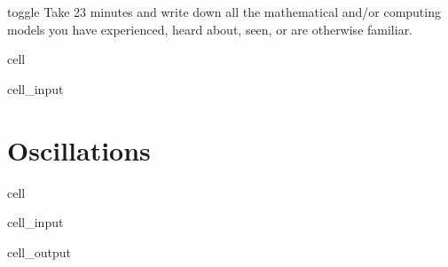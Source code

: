 \documentclass[letterpaper,10pt,english]{jupyterBook}
\begin{document}
\begin{sphinxuseclass}{toggle}
\sphinxAtStartPar
Take 2\sphinxhyphen{}3 minutes and write down all the mathematical and/or computing models you have experienced, heard about, seen, or are otherwise familiar.

\end{sphinxuseclass}
\begin{sphinxuseclass}{cell}\begin{sphinxVerbatimInput}

\begin{sphinxuseclass}{cell_input}
\begin{sphinxVerbatim}[commandchars=\\\{\}]

\end{sphinxVerbatim}

\end{sphinxuseclass}\end{sphinxVerbatimInput}

\end{sphinxuseclass}
\sphinxstepscope


\chapter{Oscillations}
\label{\detokenize{content/2_oscillations/readings-oscillators:oscillations}}\label{\detokenize{content/2_oscillations/readings-oscillators::doc}}
\begin{sphinxuseclass}{cell}\begin{sphinxVerbatimInput}

\begin{sphinxuseclass}{cell_input}
\begin{sphinxVerbatim}[commandchars=\\\{\}]
   
  
\end{sphinxVerbatim}

\end{sphinxuseclass}\end{sphinxVerbatimInput}
\begin{sphinxVerbatimOutput}

\begin{sphinxuseclass}{cell_output}
\noindent{}

\end{sphinxuseclass}\end{sphinxVerbatimOutput}

\end{sphinxuseclass}
\sphinxstepscope
\end{document}
